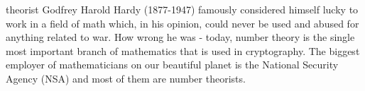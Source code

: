 theorist Godfrey Harold Hardy (1877-1947) famously considered himself lucky to work in a field of math which, in his opinion, could never be used and abused for anything related to war. How wrong he was - today, number theory is the single most important branch of mathematics that is used in cryptography. The biggest employer of mathematicians on our beautiful planet is the National Security Agency (NSA) and most of them are number theorists.








